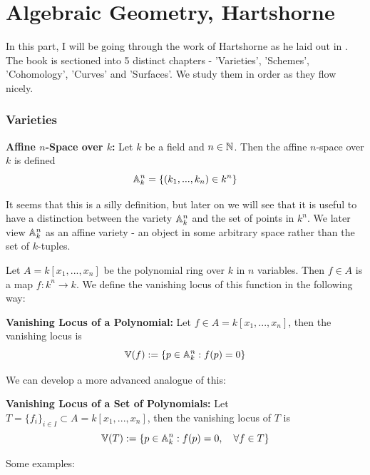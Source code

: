 \part{Algebraic Geometry, Hartshorne}
In this part, I will be going through the work of Hartshorne as he laid out in \cite{hartshorne2013algebraic}. The book is sectioned into 5 distinct chapters - 'Varieties', 'Schemes', 'Cohomology', 'Curves' and 'Surfaces'. We study them in order as they flow nicely. 

\section{Varieties}

\begin{definition}
\textbf{Affine $n$-Space over $k$: } Let $k$ be a field and $n \in \mathbb{N}$. Then the affine $n$-space over $k$ is defined
\[\mathbb{A}_k^n = \{(k_1,...,k_n)\in k^n\}\]
\end{definition}
It seems that this is a silly definition, but later on we will see that it is useful to have a distinction between the variety $\mathbb{A}^n_k$ and the set of points in $k^n$. We later view $\mathbb{A}_k^n$ as an affine variety - an object in some arbitrary space rather than the set of $k$-tuples. 

Let $A = k[x_1,...,x_n]$ be the polynomial ring over $k$ in $n$ variables. Then $f\in A$ is a map $f: k^n \to k$. We define the vanishing locus of this function in the following way:

\begin{definition}
    \textbf{Vanishing Locus of a Polynomial: }Let $f\in A = k[x_1,...,x_n]$, then the vanishing locus is
    \[\mathbb{V}(f) := \{p\in \mathbb{A}_k^n: f(p) = 0\}\]
\end{definition}

We can develop a more advanced analogue of this:
\begin{definition}
    \textbf{Vanishing Locus of a Set of Polynomials: }Let $T = \{f_i\}_{i \in I} \subset A = k[x_1,...,x_n]$, then the vanishing locus of $T$ is
    \[\mathbb{V}(T) := \{p\in \mathbb{A}_k^n: f(p) = 0, \quad \forall f \in T\}\]
\end{definition}

Some examples:

